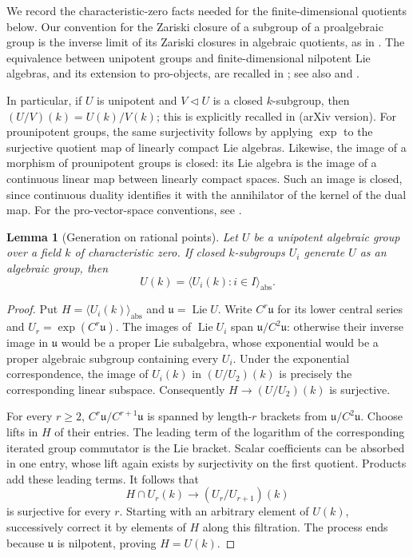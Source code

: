 \documentclass[11pt,a4paper]{article}
\newtheorem{lemma}[theorem]{Lemma}
\begin{document}
We record the characteristic-zero facts needed for the finite-dimensional
quotients below.  Our convention for the Zariski closure of a subgroup
of a proalgebraic group is the inverse limit of its Zariski closures in
algebraic quotients, as in \cite[Section~2]{HM2003}.  The equivalence between
unipotent groups and finite-dimensional nilpotent Lie algebras, and its
extension to pro-objects, are recalled in
\cite[Section~3.1]{HainWeight2008}; see also \cite[Section~3]{Hain1993}
and \cite[Propositions~14.32, 14.36 and Theorem~14.37]{MilneAG2017}.

In particular, if $U$ is unipotent and $V\triangleleft U$ is a closed
$k$-subgroup, then $(U/V)(k)=U(k)/V(k)$; this is explicitly recalled in
\cite[Section~7.4, proof of Lemma~7.5]{HM2003} (arXiv version).
For prounipotent groups, the same surjectivity follows by applying
$\exp$ to the surjective quotient map of linearly compact Lie algebras.
Likewise, the image of a morphism of prounipotent groups is closed:
its Lie algebra is the image of a continuous linear map between
linearly compact spaces.  Such an image is closed, since continuous
duality identifies it with the annihilator of the kernel of the dual
map.  For the pro-vector-space conventions, see
\cite[Section~2.1]{HainWeight2008}.

\begin{lemma}[Generation on rational points]\label{lem:unipotent-generation}
Let $U$ be a unipotent algebraic group over a field $k$ of characteristic
zero.  If closed $k$-subgroups $U_i$ generate $U$ as an algebraic group,
then
\[
 U(k)=\langle U_i(k):i\in I\rangle_{\mathrm{abs}}.
\]
\end{lemma}
\begin{proof}
Put $H=\langle U_i(k)\rangle_{\mathrm{abs}}$ and
$\mathfrak u=\operatorname{Lie}U$.  Write $C^r\mathfrak u$ for its lower
central series and $U_r=\exp(C^r\mathfrak u)$.
The images of $\operatorname{Lie}U_i$ span
$\mathfrak u/C^2\mathfrak u$: otherwise their inverse image in
$\mathfrak u$ would be a proper Lie subalgebra, whose exponential would
be a proper algebraic subgroup containing every $U_i$.
Under the exponential correspondence, the image of $U_i(k)$ in
$(U/U_2)(k)$ is precisely the corresponding linear subspace.
Consequently $H\to(U/U_2)(k)$ is surjective.

For every $r\geq2$, $C^r\mathfrak u/C^{r+1}\mathfrak u$ is spanned by
length-$r$ brackets from $\mathfrak u/C^2\mathfrak u$.
Choose lifts in $H$ of their entries.  The leading term of the logarithm
of the corresponding iterated group commutator is the Lie bracket.
Scalar coefficients can be absorbed in one entry, whose lift again
exists by surjectivity on the first quotient.  Products add these
leading terms.  It follows that
\[
 H\cap U_r(k)\longrightarrow (U_r/U_{r+1})(k)
\]
is surjective for every $r$.  Starting with an arbitrary element of
$U(k)$, successively correct it by elements of $H$ along this filtration.
The process ends because $\mathfrak u$ is nilpotent, proving $H=U(k)$.
\end{proof}
\end{document}

